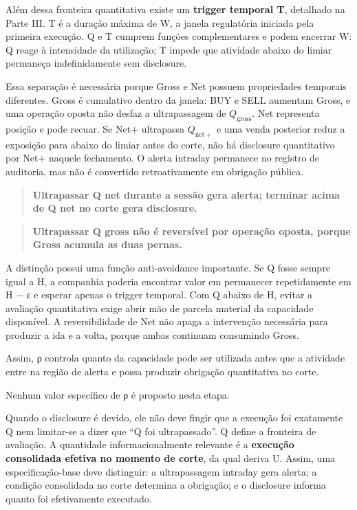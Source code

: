 \documentclass[
  a4paper,
]{article}
\begin{document}
Além dessa fronteira quantitativa existe um \textbf{trigger temporal T},
detalhado na Parte III. T é a duração máxima de W, a janela regulatória
iniciada pela primeira execução. Q e T cumprem funções complementares e
podem encerrar W: Q reage à intensidade da utilização; T impede que
atividade abaixo do limiar permaneça indefinidamente sem disclosure.

Essa separação é necessária porque Gross e Net possuem propriedades
temporais diferentes. Gross é cumulativo dentro da janela: BUY e SELL
aumentam Gross, e uma operação oposta não desfaz a ultrapassagem de
\(Q_{\mathrm{gross}}\). Net representa posição e pode recuar. Se Net+
ultrapassa \(Q_{\mathrm{net}+}\) e uma venda posterior reduz a exposição
para abaixo do limiar antes do corte, não há disclosure quantitativo por
Net+ naquele fechamento. O alerta intraday permanece no registro de
auditoria, mas não é convertido retroativamente em obrigação pública.

\begin{quote}
\textbf{Ultrapassar Q net durante a sessão gera alerta; terminar acima
de Q net no corte gera disclosure.}
\end{quote}

\begin{quote}
\textbf{Ultrapassar Q gross não é reversível por operação oposta, porque
Gross acumula as duas pernas.}
\end{quote}

A distinção possui uma função anti-avoidance importante. Se Q fosse
sempre igual a H, a companhia poderia encontrar valor em permanecer
repetidamente em H − ε e esperar apenas o trigger temporal. Com Q abaixo
de H, evitar a avaliação quantitativa exige abrir mão de parcela
material da capacidade disponível. A reversibilidade de Net não apaga a
intervenção necessária para produzir a ida e a volta, porque ambas
continuam consumindo Gross.

Assim, ρ controla quanto da capacidade pode ser utilizada antes que a
atividade entre na região de alerta e possa produzir obrigação
quantitativa no corte.

Nenhum valor específico de ρ é proposto nesta etapa.

Quando o disclosure é devido, ele não deve fingir que a execução foi
exatamente Q nem limitar-se a dizer que ``Q foi ultrapassado''. Q define
a fronteira de avaliação. A quantidade informacionalmente relevante é a
\textbf{execução consolidada efetiva no momento de corte}, da qual
deriva U. Assim, uma especificação-base deve distinguir: a ultrapassagem
intraday gera alerta; a condição consolidada no corte determina a
obrigação; e o disclosure informa quanto foi efetivamente executado.
\end{document}
